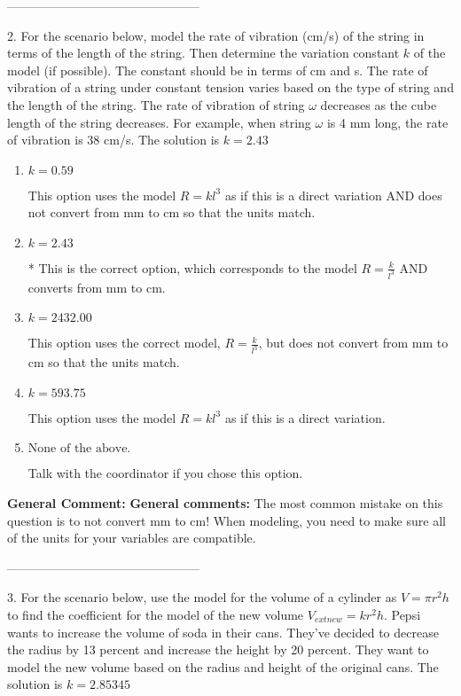 \documentclass{extbook}[14pt]
\begin{document}
-----------------------------------------------

2. For the scenario below, model the rate of vibration (cm/s) of the string in terms of the length of the string. Then determine the variation constant $k$ of the model (if possible). The constant should be in terms of cm and s.
The rate of vibration of a string under constant tension varies based on the type of string and the length of the string. The rate of vibration of string $\omega$ decreases as the cube length of the string decreases. For example, when string $\omega$ is 4 mm long, the rate of vibration is 38 cm/s. 
The solution is $ k = 2.43 $ 

\begin{enumerate}[label=\Alph*.] 
\item $ k = 0.59 $ 

 This option uses the model $R = kl^{3}$ as if this is a direct variation AND does not convert from mm to cm so that the units match. 
\item $ k = 2.43 $ 

 * This is the correct option, which corresponds to the model $R = \frac{k}{l^{3}}$ AND converts from mm to cm. 
\item $ k = 2432.00 $ 

 This option uses the correct model, $R = \frac{k}{l^{3}}$, but does not convert from mm to cm so that the units match. 
\item $ k = 593.75 $ 

 This option uses the model $R = kl^{3}$ as if this is a direct variation. 
\item $ \text{None of the above.} $ 

 Talk with the coordinator if you chose this option. 
\end{enumerate} 
 
\textbf{General Comment:} \textbf{General comments:} The most common mistake on this question is to not convert mm to cm! When modeling, you need to make sure all of the units for your variables are compatible. 

-----------------------------------------------

3. For the scenario below, use the model for the volume of a cylinder as $V = \pi r^2 h$ to find the coefficient for the model of the new volume $V_{	ext{new}} = k r^2 h$.
Pepsi wants to increase the volume of soda in their cans. They've decided to decrease the radius by 13 percent and increase the height by 20 percent. They want to model the new volume based on the radius and height of the original cans. 
The solution is $ k = 2.85345 $ 
\end{document}
